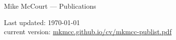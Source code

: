 \documentclass[11pt]{article}
\begin{document}
\raggedbottom
\raggedright

\begin{center}
  {\Large Mike McCourt --- Publications}
\end{center}



\vfill
\begin{minipage}[h!]{\linewidth}
  \hspace*{\fill}
  \begin{center}
    {\scriptsize  Last updated: \today \\
      current version: 
      \href{http://mkmcc.github.io/cv/mkmcc-publist.pdf}%
      {mkmcc.github.io/cv/mkmcc-publist.pdf}}
  \end{center}
  \hspace*{\fill}
\end{minipage}
\end{document}
